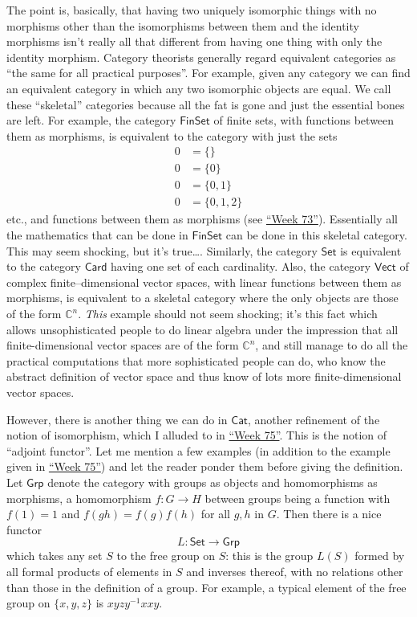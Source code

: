 \documentclass{article}
\begin{document}
The point is, basically, that having two uniquely isomorphic things with
no morphisms other than the isomorphisms between them and the identity
morphisms isn't really all that different from having one thing with
only the identity morphism. Category theorists generally regard
equivalent categories as ``the same for all practical purposes''. For
example, given any category we can find an equivalent category in which
any two isomorphic objects are equal. We call these ``skeletal''
categories because all the fat is gone and just the essential bones are
left. For example, the category \(\mathsf{FinSet}\) of finite sets, with
functions between them as morphisms, is equivalent to the category with
just the sets \[
  \begin{aligned}
    0 &= \{\}
  \\0 &= \{0\}
  \\0 &= \{0,1\}
  \\0 &= \{0,1,2\}
  \end{aligned}
\] etc., and functions between them as morphisms (see
\protect\hyperlink{week73}{``Week 73''}). Essentially all the
mathematics that can be done in \(\mathsf{FinSet}\) can be done in this
skeletal category. This may seem shocking, but it's true\ldots.
Similarly, the category \(\mathsf{Set}\) is equivalent to the category
\(\mathsf{Card}\) having one set of each cardinality. Also, the category
\(\mathsf{Vect}\) of complex finite--dimensional vector spaces, with
linear functions between them as morphisms, is equivalent to a skeletal
category where the only objects are those of the form \(\mathbb{C}^n\).
\emph{This} example should not seem shocking; it's this fact which
allows unsophisticated people to do linear algebra under the impression
that all finite-dimensional vector spaces are of the form
\(\mathbb{C}^n\), and still manage to do all the practical computations
that more sophisticated people can do, who know the abstract definition
of vector space and thus know of lots more finite-dimensional vector
spaces.

However, there is another thing we can do in \(\mathsf{Cat}\), another
refinement of the notion of isomorphism, which I alluded to in
\protect\hyperlink{week75}{``Week 75''}. This is the notion of ``adjoint
functor''. Let me mention a few examples (in addition to the example
given in \protect\hyperlink{week75}{``Week 75''}) and let the reader
ponder them before giving the definition. Let \(\mathsf{Grp}\) denote
the category with groups as objects and homomorphisms as morphisms, a
homomorphism \(f\colon G\to H\) between groups being a function with
\(f(1) = 1\) and \(f(gh) = f(g)f(h)\) for all \(g, h\) in \(G\). Then
there is a nice functor \[L\colon\mathsf{Set}\to\mathsf{Grp}\] which
takes any set \(S\) to the free group on \(S\): this is the group
\(L(S)\) formed by all formal products of elements in \(S\) and inverses
thereof, with no relations other than those in the definition of a
group. For example, a typical element of the free group on \(\{x,y,z\}\)
is \(xyzy^{-1}xxy\).
\end{document}
